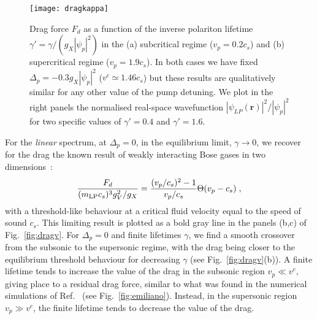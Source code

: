 \begin{figure}[tb]\centering
\texttt{[image: dragkappa]}
\caption{
%
Drag force $F_d$ as a function of the inverse polariton
lifetime $\gamma'=\gamma/(g_X |\psi_p|^2)$ in the (a) subcritical regime
($v_p=0.2 c_s$) and (b) supercritical regime ($v_p=1.9 c_s$). In both
cases we have fixed $\Delta_p=-0.3g_X|\psi_p|^2$ ($v^c \simeq 1.46 c_s$)
but these results are qualitatively similar for any other value of the
pump detuning. We plot in the right panels the normalised real-space
wavefunction $|\psi_{LP}(\bm{r})|^2/|\psi_p|^2$ for two specific
values of $\gamma'=0.4$ and $\gamma'=1.6$.
%
}\label{fig:dragk}
\end{figure}

For the \emph{linear} spectrum, at $\Delta_p=0$, in the equilibrium
limit, $\gamma \to 0$, we recover for the drag the known result of
weakly interacting Bose gases in two
dimensions~\cite{Astrakharchik_2004}:
%
\begin{equation}
  \frac{F_d}{(m_{\text{LP}}c_s)^3 g_V^2/g_X}=\frac{(v_p/c_s)^2 - 1}{v_p/c_s}
  \Theta(v_p - c_s)\; ,
\label{eq:drag0}
\end{equation}
%
with a threshold-like behaviour at a critical fluid velocity equal to
the speed of sound $c_s$. This limiting result is plotted as a bold
gray line in the panels (b,c) of Fig.~\ref{fig:dragv}. For
$\Delta_p=0$ and finite lifetimes $\gamma$, we find a smooth crossover
from the subsonic to the supersonic regime, with the drag being closer
to the equilibrium threshold behaviour for decreasing $\gamma$ (see
Fig.~\ref{fig:dragv}(b)). A finite lifetime tends to increase the
value of the drag in the subsonic region $v_p \ll v^c$, giving place
to a residual drag force, similar to what was found in the numerical
simulations of Ref.~\cite{Cancellieri_2010} (see
Fig.~\ref{fig:emiliano}). Instead, in the supersonic region
$v_p \gg v^c$, the finite lifetime tends to decrease the value of the
drag. 

